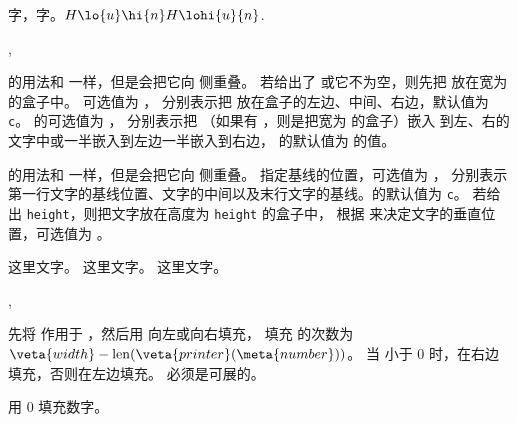 \documentclass{cusdoc}
\begin{document}
\begin{xample}
\Large 字，字。$ H\lo{u}\hi{n} H\lohi{u}{n}$.
\stopxamplecode
\xampleprint
\end{xample}

\begin{function}{\makelapbox,\parlapbox}
  \begin{syntax}
    \V\makelapbox {}
    \V\makelapbox {}  
    \V\makelapbox {}   
    \V\parlapbox  {} 
    \V\parlapbox  {}    
    \V\parlapbox  {}     
  \end{syntax}

 的用法和  一样，但是会把它向  侧重叠。
若给出了  或它不为空，则先把  放在宽为  的盒子中。
 可选值为 ，
分别表示把  放在盒子的左边、中间、右边，默认值为 \texttt{c}。
 的可选值为 ，
分别表示把 （如果有 ，则是把宽为  的盒子）嵌入
到左、右的文字中或一半嵌入到左边一半嵌入到右边， 的默认值为  的值。

 的用法和  一样，但是会把它向  侧重叠。
 指定基线的位置，可选值为 ，
分别表示第一行文字的基线位置、文字的中间以及末行文字的基线。的默认值为 \texttt{c}。
若给出 \texttt{height}，则把文字放在高度为 \texttt{height} 的盒子中，
根据  来决定文字的垂直位置，可选值为 。
\end{function}

\begin{xample}
这里文字。
这里文字。
这里文字。
\stopxamplecode
\xampleprint
\end{xample}

\begin{function}[rEXP]{\numberfixedwidth,\numberzerofill}
  \begin{syntax}
    \V\numberfixedwidth {}   
    \V\numberzerofill {} 
  \end{syntax}
先将  作用于 ，然后用  向左或向右填充，
填充  的次数为 $\veta{width}-\mathrm{len}(\veta{printer}(\meta{number}))$。
当  小于 0 时，在右边填充，否则在左边填充。
 必须是可展的。

 用 0 填充数字。
\end{function}
\end{document}
